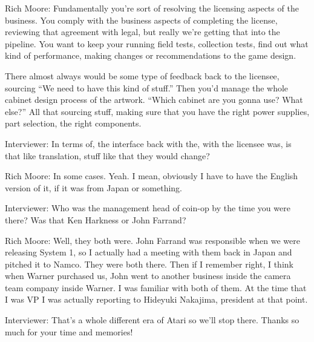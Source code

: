 \textcolor{interviewee}{Rich Moore:} Fundamentally you’re sort of resolving the licensing aspects of the business. You comply with the business aspects of completing the license, reviewing that agreement with legal, but really we're getting that into the pipeline. You want to keep your running field tests, collection tests, find out what kind of performance, making changes or recommendations to the game design. 

There almost always would be some type of feedback back to the licensee, sourcing “We need to have this kind of stuff.” Then you'd manage the whole cabinet design process of the artwork. “Which cabinet are you gonna use? What else?” All that sourcing stuff, making sure that you have the right power supplies, part selection, the right components.

\textcolor{interviewer}{Interviewer:} In terms of, the interface back with the, with the licensee was, is that like translation, stuff like that they would change?

\textcolor{interviewee}{Rich Moore:} In some cases. Yeah. I mean, obviously I have to have the English version of it, if it was from Japan or something.

\textcolor{interviewer}{Interviewer:} Who was the management head of coin-op by the time you were there? Was that Ken Harkness or John Farrand?

\textcolor{interviewee}{Rich Moore:} Well, they both were. John Farrand was responsible when we were releasing System 1, so I actually had a meeting with them back in Japan and pitched it to Namco. They were both there. Then if I remember right, I think when Warner purchased us, John went to another business inside the camera team company inside Warner. I was familiar with both of them. At the time that I was VP I was actually reporting to Hideyuki Nakajima, president at that point.

\textcolor{interviewer}{Interviewer:} That’s a whole different era of Atari so we’ll stop there. Thanks so much for your time and memories!
